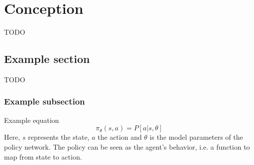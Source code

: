 \chapter{Conception}
TODO

\section{Example section}
TODO

\subsection{Example subsection}
Example equation
\begin{equation}
	\pi_\theta(s, a) = P [a | s, \theta]
\end{equation}
Here, $s$ represents the state, $a$ the action and $\theta$ is the model parameters of the policy network. The policy can be seen as the agent’s behavior, i.e. a function to map from state to action.